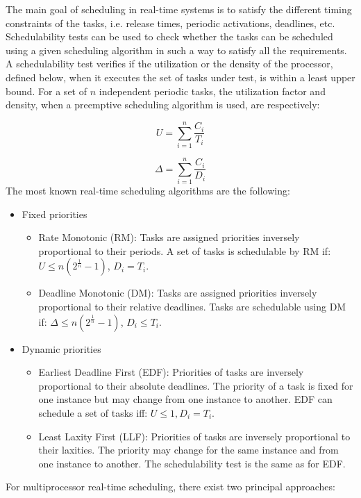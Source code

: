 The main goal of scheduling in real-time systems is to satisfy the different timing constraints of the tasks, i.e. release times, periodic activations, deadlines, etc. Schedulability tests can be used to check whether the tasks can be scheduled using a given scheduling algorithm in such a way to satisfy all the requirements. A schedulability test verifies if the utilization or the density of the processor, defined below, when it executes the set of tasks under test, is within a least upper bound. For a set of $n$ independent periodic tasks, the utilization factor and density, when a preemptive scheduling algorithm is used, are respectively:

\begin{equation}
U = \sum_{i=1}^{n}\frac{C_i}{T_i}
\end{equation}

\begin{equation}
\Delta = \sum_{i=1}^{n}\frac{C_i}{D_i}
\end{equation}
The most known real-time scheduling algorithms are the following:

\begin{itemize}
\item Fixed priorities
\begin{itemize}
\item Rate Monotonic (RM): Tasks are assigned priorities inversely proportional to their periods. A set of tasks is schedulable by RM if: $U \leq n(2^{\frac{1}{n}}-1)$, $D_i = T_i$. 
\item Deadline Monotonic (DM): Tasks are assigned priorities inversely proportional to their relative deadlines. Tasks are schedulable using DM if: $\Delta \leq n(2^{\frac{1}{n}}-1)$, $D_i \leq T_i$. 
\end{itemize}
\item Dynamic priorities
\begin{itemize}
\item Earliest Deadline First (EDF): Priorities of tasks are inversely proportional to their absolute deadlines. The priority of a task is fixed for one instance but may change from one instance to another. EDF can schedule a set of tasks iff: $U \leq 1, D_i = T_i$.
\item Least Laxity First (LLF): Priorities of tasks are inversely proportional to their laxities. The priority may change for the same instance and from one instance to another. The schedulability test is the same as for EDF.
\end{itemize}
\end{itemize}
 For multiprocessor real-time scheduling, there exist two principal approaches:

